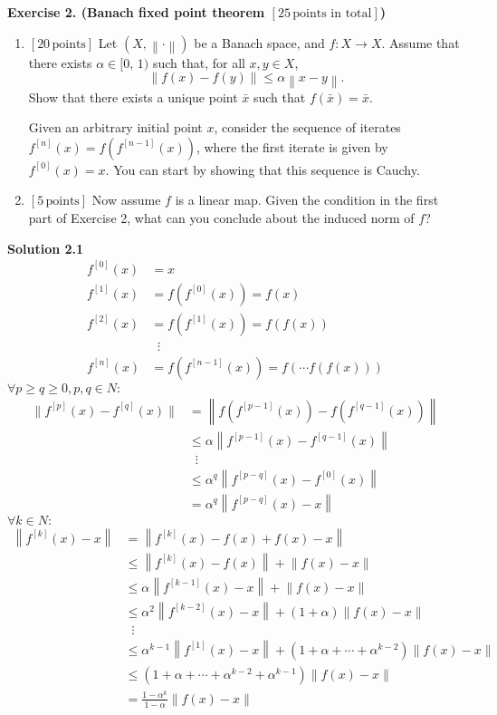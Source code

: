 \documentclass[a4paper,10.5pt]{article}
\newcommand{\norm}[1]{\left\lVert#1\right\rVert}
\begin{document}
\clearpage

{\bf Exercise 2. (Banach fixed point theorem  {\bf$[25\, \text{points in total}]$})}
\begin{enumerate}
\item {\bf$[20\, \text{points}]$} Let $\left(X, \left\lVert\cdot\right\rVert\right)$ be a Banach space, and $f:X\rightarrow X$. Assume that there exists $\alpha\in[0,\, 1)$ such that, for all $x,y\in X$,
\begin{displaymath}
\left\lVert f(x) - f(y) \right\rVert
\leq
\alpha
\left\lVert x - y \right\rVert.
\end{displaymath}
Show that there exists a unique point $\bar{x}$ such that $f(\bar{x}) = \bar{x}$.

Given an arbitrary initial point $x$,
consider the sequence of iterates 
$f^{[n]}(x) = f(f^{[n-1]}(x))$, where the first iterate is given by $f^{[0]}(x)=x$. You can start by showing that this sequence is Cauchy.

\item {\bf$[5\, \text{points}]$} Now assume $f$ is a linear map. Given the condition in the first part of Exercise 2, what can you conclude about the induced norm of $f$?

\end{enumerate}

\noindent \textbf {Solution 2.1}
\begin{align*}
	f^{[0]}(x) &= x \\
	f^{[1]}(x) &= f\left(f^{[0]}(x)\right) = f(x) \\
	f^{[2]}(x) &= f\left(f^{[1]}(x)\right) = f(f(x)) \\
			   & \;\; \vdots \\
	f^{[n]}(x) &= f\left(f^{[n-1]}(x)\right) = f(\cdots f(f(x)))		  
\end{align*}
$\forall p\geq q\geq 0, p,q\in N:$
\begin{align*}
	\|f^{[p]}(x)-f^{[q]}(x)\| &= \norm{f\left(f^{[p-1]}(x)\right)-f\left(f^{[q-1]}(x)\right)} \\
	&\leq \alpha \norm{f^{[p-1]}(x)-f^{[q-1]}(x)} \\
	& \; \; \vdots \\
	&\leq \alpha^{q} \norm{f^{[p-q]}(x)-f^{[0]}(x)} \\
	&= \alpha^q \norm{f^{[p-q]}(x)-x}
\end{align*}
$\forall k \in N:$
\begin{align*}
	\norm{f^{[k]}(x)-x} &= \norm{f^{[k]}(x)-f(x)+f(x)-x} \\
	&\leq \norm{f^{[k]}(x)-f(x)}+\norm{f(x)-x} \\
	&\leq \alpha\norm{f^{[k-1]}(x)-x}+\norm{f(x)-x} \\
	&\leq \alpha^2\norm{f^{[k-2]}(x)-x}+\left(1+\alpha\right)\norm{f(x)-x} \\
	& \;\; \vdots \\
	&\leq \alpha^{k-1}\norm{f^{[1]}(x)-x} + \left(1+\alpha+\cdots+\alpha^{k-2}\right)\norm{f(x)-x} \\
	&\leq \left(1+\alpha+\cdots+\alpha^{k-2}+\alpha^{k-1}\right)\norm{f(x)-x} \\
	&=\frac{1-\alpha^k}{1-\alpha}\norm{f(x)-x}
\end{align*}
\end{document}
